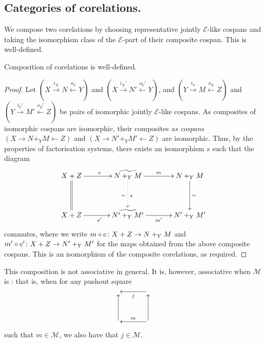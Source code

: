 \subsection{Categories of corelations.}

We compose two corelations by choosing representative jointly $\mathcal E$-like
cospans and taking the isomorphism class of the $\mathcal E$-part of their
composite cospan.  This is well-defined.

\begin{proposition}
  Composition of corelations is well-defined.
\end{proposition}
\begin{proof}
  Let
    $(X \stackrel{i_X}{\longrightarrow} N \stackrel{o_Y}{\longleftarrow} Y)$ and 
    $(X \stackrel{i_X'}{\longrightarrow} N' \stackrel{o_Y'}{\longleftarrow} Y)$,
  and
    $(Y \stackrel{i_Y}{\longrightarrow} M \stackrel{o_Z}{\longleftarrow} Z)$ and 
    $(Y \stackrel{i_Y'}{\longrightarrow} M' \stackrel{o_Z'}{\longleftarrow} Z)$
  be pairs of isomorphic jointly $\mathcal E$-like cospans. As composites
  of isomorphic cospans are isomorphic, their composites \emph{as cospans}
    $(X \longrightarrow N+_YM \longleftarrow Z)$ and 
    $(X \longrightarrow N'+_YM' \longleftarrow Z)$
  are isomorphic. Thus, by the properties of factorisation systems, there exists
  an isomorphism $s$ such that the diagram
  \[
    \xymatrixcolsep{3pc}
    \xymatrixrowsep{3pc}
    \xymatrix{
      X+Z \ar[r]^e \ar@{=}[d] & \widetilde{N+_YM} \ar[r]^m \ar@{.>}[d]^{s}_\sim & N+_YM
      \ar[d]^\sim \\
      X+Z \ar[r]_{e'}&\widetilde{N'+_YM'} \ar[r]_{m'} & N'+_YM'
    }
  \]
  commutes, where we write $m\circ e{\colon} X+Z \to N+_YM$ and $m'\circ e'{\colon}
  X+Z \to N'+_YM'$ for the maps obtained from the above composite cospans. This
  is an isomorphism of the composite corelations, as required.
\end{proof}

This composition is not associative in general. It is, however, associative when
$\mathcal M$ is : that is, when for any pushout square
  \[
    \xymatrixcolsep{3pc}
    \xymatrixrowsep{3pc}
    \xymatrix{
      & \ar[l]^j \\
      \ar[u] &  \ar[u] \ar[l]_m 
    }
  \]
such that $m \in \mathcal M$, we also have that $j \in \mathcal M$. 

